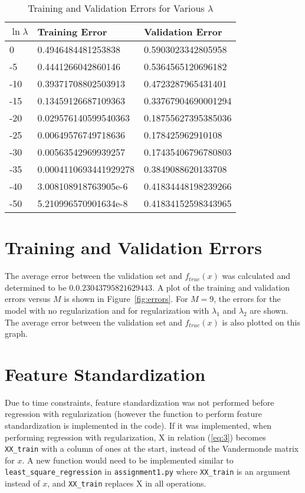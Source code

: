 \documentclass[12pt]{article}
\begin{document}
\begin{table}[htp]
    \centering
    \begin{tabular}{|l|l|l|}
    \hline
    $\ln \lambda$ & Training Error        & Validation Error    \\ \hline
    0             & 0.4946484481253838    & 0.5903023342805958  \\ \hline
    -5            & 0.4441266042860146    & 0.5364565120696182  \\ \hline
    -10           & 0.39371708802503913   & 0.4723287965431401  \\ \hline
    -15           & 0.13459126687109363   & 0.33767904690001294 \\ \hline
    -20           & 0.029576140599540363  & 0.18755627395385036 \\ \hline
    -25           & 0.00649576749718636   & 0.178425962910108   \\ \hline
    -30           & 0.00563542969939257   & 0.17435406796780803 \\ \hline
    -35           & 0.0004110693441929278 & 0.3849088620133708  \\ \hline
    -40           & 3.008108918763905e-6  & 0.41834448198239266 \\ \hline
    -50           & 5.210996570901634e-8  & 0.41834152598343965 \\ \hline
    \end{tabular}
\caption{Training and Validation Errors for Various $\lambda$}
\label{tab:reg_errors}
\end{table}

\section*{Training and Validation Errors}
The average error between the validation set and $f_{true}(x)$ was calculated and determined to be $0.0.23043795821629443$. A plot of the training and validation errors versus $M$ is shown in Figure~\ref{fig:errors}. For $M = 9$, the errors for the model with no regularization and for regularization with $\lambda_1$ and $\lambda_2$ are shown. The average error between the validation set and $f_{true}(x)$ is also plotted on this graph.

\section*{Feature Standardization}
Due to time constraints, feature standardization was not performed before regression with regularization (however the function to perform feature standardization is implemented in the code). If it was implemented, when performing regression with regularization, X in relation (\ref{eq:3}) becomes \texttt{XX\_train} with a column of ones at the start, instead of the Vandermonde matrix for $x$. A new function would need to be implemented similar to \texttt{least\_square\_regression} in \texttt{assignment1.py} where \texttt{XX\_train} is an argument instead of $x$, and \texttt{XX\_train} replaces X in all operations.














\end{document}
